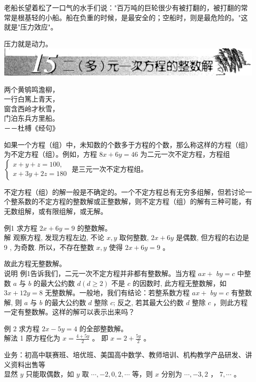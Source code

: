 \documentclass[10pt]{article}
\begin{document}
老船长望着松了一口气的水手们说："百万吨的巨轮很少有被打翻的，被打翻的常常是根基轻的小船。船在负重的时候，是最安全的；空船时，则是最危险的。"这就是"压力效应"。

压力就是动力。\\
\includegraphics[max width=\textwidth, center]{2024_10_30_26b590fd1106d28139f0g-095}

两个黄鸲鸣澹柳，\\
一行白篤上青天，\\
窗含西岭才秋雪，\\
门泊东兵方里船。\\
－－杜榑《经句》

如果一个方程（组）中，未知数的个数多于方程的个数，那么称这样的方程（组）为不定方程（组）。例如，方程 $8 x+6 y=46$ 为二元一次不定方程，方程组 $\left\{\begin{array}{l}x+y+z=100, \\ x+3 y+2 z=180\end{array}\right.$ 是三元一次不定方程组。

不定方程（组）的解一般是不确定的。一个不定方程总有无穷多组解，但若讨论一个整系数的不定方程的整数解或正整数解，则不定方程（组）的解有三种可能，有无数组解，或有限组解，或无解。

例1 求方程 $2 x+6 y=9$ 的整数解。\\
解 观察方程, 发现方程左边, 不论 $x, y$ 取何整数, $2 x+6 y$ 是偶数, 但方程的右边是 9 , 为奇数. 所以，不存在整数 $x, y$ 使得 $2 x+6 y=9$ 。

故此方程无整数解。\\
说明 例1告诉我们，二元一次不定方程并非都有整数解。当方程 $a x+$ $b y=c$ 中整数 $a$ 与 $b$ 的最大公约数 $d(d \geqslant 2)$ 不是 $c$ 的因数时, 此方程无整数解，如 $3 x+12 y=8$ 无整数解。一般地，我们有结论：若整系数方程 $a x+$ $b y=c$ 有整数解, 则 $a$ 与 $b$ 的最大公约数 $d$ 整除 $c$; 反之, 若其最大公约数 $d$ 整除 $c$ ，则此方程一定有整数解。这样的解可以表示出来吗？

例 2 求方程 $2 x-5 y=4$ 的全部整数解。\\
解法 1 原方程化为 $x=\frac{4+5 y}{2}$ 。 即 $x=2+\frac{5 y}{2}$ 。

业务：初高中联赛班、培优班、美国高中数学、教师培训、机构教学产品研发、讲义资料出售等\\
显然 $y$ 只能取偶数，如 $y$ 取 $\cdots,-2,0,2, \cdots$ 等，则 $x$ 分别为 $\cdots,-3,2$ ， $7, \cdots$ 。
\end{document}
